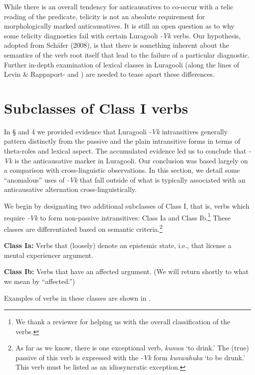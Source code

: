 \documentclass[output=paper]{langsci/langscibook}
\begin{document}
While there is an overall tendency for anticausatives to co-occur with a telic reading of the predicate, telicity is not an absolute requirement for morphologically marked anticausatives. It is still an open question as to why some telicity diagnostics fail with certain Luragooli \textit{-Vk} verbs. Our hypothesis, adopted from Schäfer (2008), is that there is something inherent about the semantics of the verb root itself that lead to the failure of a particular diagnostic. Further in-depth examination of lexical classes in Luragooli (along the lines of Levin \& Rappaport-\citet{Hovav1995} and \citet{Haspelmath2005}) are needed to tease apart these differences. 

\section{Subclasses of Class I verbs}

In § and 4 we provided evidence that Luragooli \textit{-Vk} intransitives generally pattern distinctly from the passive and the plain intransitive forms in terms of theta-roles and lexical aspect. The accumulated evidence led us to conclude that \textit{-Vk} is the anticausative marker in Luragooli. Our conclusion was based largely on a comparison with cross-linguistic observations. In this section, we detail some “anomalous” uses of \textit{-Vk} that fall outside of what is typically associated with an anticausative alternation cross-linguistically.

We begin by designating two additional subclasses of Class I, that is, verbs which require \textit{-Vk} to form non-passive intransitives: Class Ia and Class Ib.\footnote{We thank a reviewer for helping us with the overall classification of the verbs.} These classes are differentiated based on semantic criteria.\footnote{ As far as we know, there is one exceptional verb, \textit{kunwa} ‘to drink.’ The (true) passive of this verb is expressed with the \textit{-Vk }form \textit{kunwahuka }‘to be drunk.’ This verb must be listed as an idiosyncratic exception. }

\textbf{Class Ia:} Verbs that (loosely) denote an epistemic state, i.e., that license a mental experiencer argument.

\textbf{Class Ib:} Verbs that have an affected argument. (We will return shortly to what we mean by “affected.”)

Examples of verbs in these classes are shown in .
\end{document}
